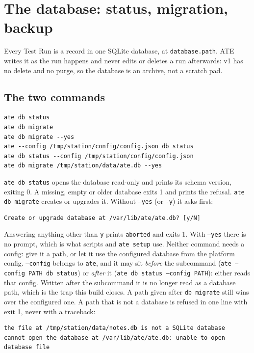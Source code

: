 \chapter{The database: status, migration, backup}\label{ch:database}

Every Test Run is a record in one SQLite database, at \texttt{database.path}. ATE writes it as the
run happens and never edits or deletes a run afterwards: v1 has no delete and no purge, so the
database is an archive, not a scratch pad.

\section{The two commands}

\begin{lstlisting}[language=ATEShell]
ate db status
ate db migrate
ate db migrate --yes
ate --config /tmp/station/config/config.json db status
ate db status --config /tmp/station/config/config.json
ate db migrate /tmp/station/data/ate.db --yes
\end{lstlisting}

\texttt{ate db status} opens the database read-only and prints its schema version, exiting 0. A
missing, empty or older database exits 1 and prints the refusal. \texttt{ate db migrate} creates or
upgrades it. Without \texttt{--yes} (or \texttt{-y}) it asks first:

\begin{lstlisting}[language=ATEShell]
Create or upgrade database at /var/lib/ate/ate.db? [y/N]
\end{lstlisting}

Answering anything other than \texttt{y} prints \texttt{aborted} and exits 1. With \texttt{--yes}
there is no prompt, which is what scripts and \texttt{ate setup} use. Neither command needs a
config: give it a path, or let it use the configured database from the platform config.
\texttt{--config} belongs to \texttt{ate}, and it may sit \emph{before} the subcommand
(\texttt{ate --config PATH db status}) or \emph{after} it (\texttt{ate db status --config PATH}):
either reads that config. Written after the subcommand it is no longer read as a database path,
which is the trap this build closes. A path given after \texttt{db migrate} still wins over the
configured one. A path that is not a database is refused in one line with exit 1, never with a
traceback:

\begin{lstlisting}[language=ATEShell]
the file at /tmp/station/data/notes.db is not a SQLite database
cannot open the database at /var/lib/ate/ate.db: unable to open database file
\end{lstlisting}

